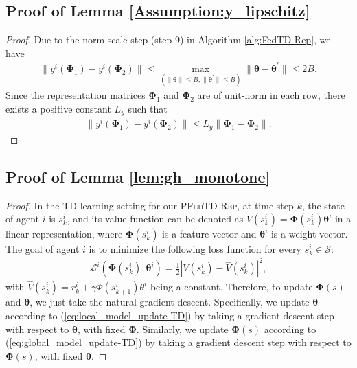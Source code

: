 \documentclass{article} %
\def\eqref#1{equation~\ref{#1}}
\theoremstyle{plain}
\theoremstyle{definition}
\theoremstyle{remark}
\renewcommand{\eqref}[1]{(\ref{#1})}
\newcommand{\FedTD}{\textsc{PFedTD-Rep}\xspace}
\begin{document}
{\subsection{Proof of Lemma \ref{Assumption:y_lipschitz}}
\begin{proof}
Due to the norm-scale step (step 9) in Algorithm \ref{alg:FedTD-Rep}, we have
\begin{align}
    \|y^i(\pmb{\Phi}_1)-y^i(\pmb{\Phi}_2)\|\leq \max_{(\|\pmb{\theta}\|\leq B, \|\pmb{\theta}^\prime\|\leq B)}\|{\pmb{\theta}-\pmb{\theta}^\prime}\|\leq 2B.
\end{align}
Since the representation matrices $\pmb{\Phi}_1$ and $\pmb{\Phi}_2$ are of unit-norm in each row, there exists a positive constant $L_y$ such that 
\begin{align}
    \|y^i(\pmb{\Phi}_1)-y^i(\pmb{\Phi}_2)\|\leq L_y\|\pmb{\Phi}_1-\pmb{\Phi}_2\|.
\end{align}
\end{proof}

\subsection{Proof of Lemma \ref{lem:gh_monotone}}
\begin{proof}
In the TD learning setting for our \FedTD, at time step $k$, the state of agent $i$ is $s_k^i$, and its value function can be denoted as $V(s_k^i) = \pmb{\Phi}(s_k^i) \pmb{\theta}^i$ in a linear representation, where $\pmb{\Phi}(s_k^i)$ is a feature vector and $\pmb{\theta}^i$ is a weight vector. The goal of agent $i$ is to minimize the following loss function for every $s_k^i \in \mathcal{S}$:
\begin{align*}
    \mathcal{L}^i(\pmb{\Phi}(s_k^i), \pmb{\theta}^i) = \frac{1}{2} \left| V(s_k^i) - \hat{V}(s_k^i) \right|^2,
\end{align*}
with 
$
\hat{V}(s_k^i) = r_k^i + \gamma \Phi(s_{k+1}^i) \theta^i
$
being a constant. Therefore, to update $\pmb{\Phi}(s)$ and $\pmb{\theta}$, we just take the natural gradient descent. 
Specifically, we update $\pmb{\theta}$ according to \eqref{eq:local_model_update-TD} by taking a gradient descent step with respect to $\pmb{\theta}$, with fixed $\pmb{\Phi}$. Similarly, we update $\pmb{\Phi}(s)$ according to \eqref{eq:global_model_update-TD} by taking a gradient descent step with respect to $\pmb{\Phi}(s)$, with fixed $\pmb{\theta}$.


\end{proof}}
\end{document}
